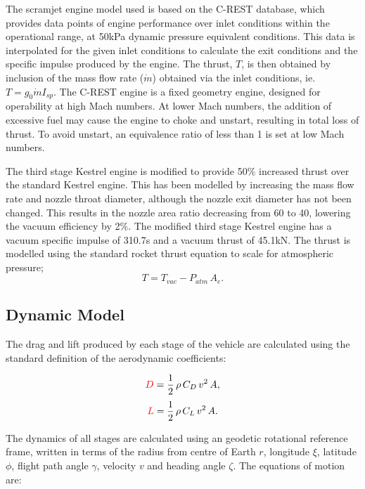 \documentclass[journal]{new-aiaa}
\begin{document}
The scramjet engine model used is based on the C-REST database\cite{Preller2017b}, which provides data points of engine performance over inlet conditions within the operational range, at 50kPa dynamic pressure equivalent conditions. This data is interpolated for the given inlet conditions to calculate the exit conditions and the specific impulse produced by the engine. The thrust, $T$, is then obtained by inclusion of the mass flow rate ($\dot{m}$) obtained via the inlet conditions, ie. $T = g_0\dot{m}I_{sp}$.
The C-REST engine is a fixed geometry engine, designed for operability at high Mach numbers\cite{Preller2017b}. At lower Mach numbers, the addition of excessive fuel may cause the engine to choke and unstart, resulting in total loss of thrust\cite{Preller2017b}. To avoid unstart, an equivalence ratio of less than 1 is set at low Mach numbers. 

 The third stage Kestrel engine is modified to provide 50\% increased thrust over the standard Kestrel engine. This has been modelled by increasing the mass flow rate and nozzle throat diameter, although the nozzle exit diameter has not been changed. This results in the nozzle area ratio decreasing from 60\cite{Vehicle2008} to 40, lowering the vacuum efficiency by 2\%\cite{RPE}. The modified third stage Kestrel engine has a vacuum specific impulse of 310.7s\cite{Vehicle2008} and a vacuum thrust of 45.1kN. The thrust is modelled using the standard rocket thrust equation to scale for atmospheric pressure; 
\begin{equation}
T = T_{vac} -P_{atm} \, A_e.
\end{equation}

\subsection{Dynamic Model} \label{subsection:dynamics}
The drag and lift produced by each stage of the vehicle are calculated using the standard definition of the aerodynamic coefficients:

\begin{equation}
\textcolor{red}{D} = \frac{1}{2} \, \rho \, C_D \, v^2 \, A ,
\end{equation}
\begin{equation}
\textcolor{red}{L} = \frac{1}{2} \, \rho \, C_L \, v^2 \, A .
\end{equation}

The dynamics of all stages are calculated using an geodetic rotational reference frame, written in terms of the radius from centre of Earth $r$, longitude $\xi$, latitude $\phi$, flight path angle $\gamma$, velocity $v$ and heading angle $\zeta$. The equations of motion are\cite{Josselyn2002}:
\end{document}
